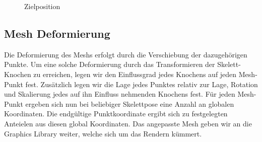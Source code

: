 \begin{figure}[!htb]
	\caption{Zielposition}\label{fig:marching_square_example_solved}
	\endminipage\hfill
\end{figure}
%
\subsection{Mesh Deformierung}
Die Deformierung des Meshs erfolgt durch die Verschiebung der dazugehörigen Punkte. Um eine solche Deformierung durch das Transformieren der Skelett-Knochen zu erreichen, legen wir den Einflussgrad jedes Knochens auf jeden Mesh-Punkt fest. Zusätzlich legen wir die Lage jedes Punktes relativ zur Lage, Rotation und Skalierung jedes auf ihn Einfluss nehmenden Knochens fest. Für jeden Mesh-Punkt ergeben sich nun bei beliebiger Skelettpose eine Anzahl an globalen Koordinaten. Die endgültige Punktkoordinate ergibt sich zu festgelegten Anteielen aus diesen global Koordinaten. Das angepasste Mesh geben wir an die Graphics Library weiter, welche sich um das Rendern kümmert.